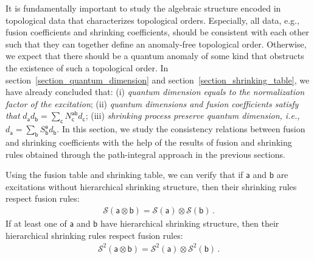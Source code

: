 \documentclass[11pt,nofootinbib,preprint]{revtex4-1}
\begin{document}
It is fundamentally important to study the algebraic structure encoded in topological data that characterizes topological orders. Especially, all data, e.g., fusion coefficients and shrinking coefficients, should be consistent with each other such that they can together define an anomaly-free topological order. Otherwise, we expect that there should be a quantum anomaly of some kind that obstructs the existence of such a topological order. In section~\ref{section_quantum_dimension} and section~\ref{section_shrinking_table}, we have already concluded that: (i) \textit{quantum dimension equals to the normalization factor of the excitation}; (ii) \textit{quantum dimensions and fusion coefficients satisfy that} $	d_{\mathsf{a}}d_{\mathsf{b}}=\sum_{\mathsf{c}}{N_{\mathsf{c}}^{\mathsf{ab}}d_{\mathsf{c}}}$; (iii) \textit{shrinking process preserve quantum dimension, i.e.,} $d_{\mathsf{a}}=\sum_{\mathsf{b}}{S_{\mathsf{b}}^{\mathsf{a}}d_{\mathsf{b}}}$. In this section, we study the consistency relations between fusion and shrinking coefficients with the help of the results of fusion and shrinking rules obtained through the path-integral approach in the previous sections. 


Using the fusion table and shrinking table, we can verify that if $\mathsf{a}$ and $ \mathsf{b}$ are excitations without hierarchical shrinking structure, then their shrinking rules respect fusion rules:
\begin{align}
	\mathcal{S} \left( \mathsf{a}\otimes \mathsf{b} \right) =\mathcal{S} \left( \mathsf{a} \right) \otimes \mathcal{S} \left( \mathsf{b} \right) \,. \label{eq_shrinking_and_fusion}
\end{align}
If at least one of $\mathsf{a}$ and $ \mathsf{b}$ have hierarchical shrinking structure, then their hierarchical shrinking rules respect fusion rules:
\begin{align}
	\mathcal{S}^{2} \left( \mathsf{a}\otimes \mathsf{b} \right) =\mathcal{S}^{2} \left( \mathsf{a} \right) \otimes \mathcal{S}^{2} \left( \mathsf{b} \right) \,.
	\label{eq_hieshrinking_and_fusion}
\end{align}
\end{document}
